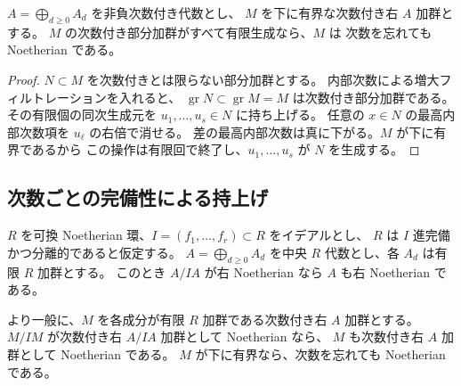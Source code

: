 \begin{lemma}
\label{lem:patch-graded-to-ungraded}
$A=\bigoplus_{d\geq0}A_d$ を非負次数付き代数とし、
$M$ を下に有界な次数付き右 $A$ 加群とする。
$M$ の次数付き部分加群がすべて有限生成なら、$M$ は
次数を忘れても Noetherian である。
\end{lemma}

\begin{proof}
$N\subset M$ を次数付きとは限らない部分加群とする。
内部次数による増大フィルトレーションを入れると、
$\operatorname{gr} N\subset\operatorname{gr} M=M$ は次数付き部分加群である。
その有限個の同次生成元を $u_1,\ldots,u_s\in N$ に持ち上げる。
任意の $x\in N$ の最高内部次数項を $u_\ell$ の右倍で消せる。
差の最高内部次数は真に下がる。$M$ が下に有界であるから
この操作は有限回で終了し、$u_1,\ldots,u_s$ が $N$ を生成する。
\end{proof}

\subsection{次数ごとの完備性による持上げ}

\begin{lemma}[完備基底上の持上げ]
\label{lem:patch-complete-lifting}
$R$ を可換 Noetherian 環、$I=(f_1,\ldots,f_r)\subset R$ をイデアルとし、
$R$ は $I$ 進完備かつ分離的であると仮定する。
$A=\bigoplus_{d\geq0}A_d$ を中央 $R$ 代数とし、各 $A_d$ は有限 $R$ 加群とする。
このとき $A/IA$ が右 Noetherian なら $A$ も右 Noetherian である。

より一般に、$M$ を各成分が有限 $R$ 加群である次数付き右 $A$ 加群とする。
$M/IM$ が次数付き右 $A/IA$ 加群として Noetherian なら、
$M$ も次数付き右 $A$ 加群として Noetherian である。
$M$ が下に有界なら、次数を忘れても Noetherian である。
\end{lemma}

